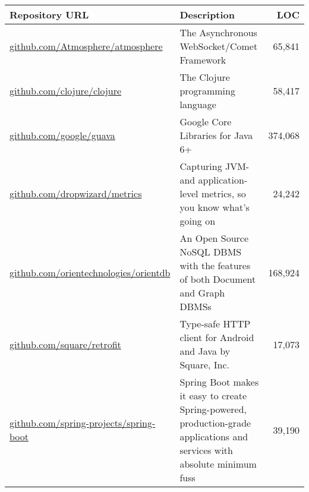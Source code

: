 \begin{tabular}{@{}lp{10cm}r@{}}
\toprule
Repository URL & Description & LOC \\
\midrule
\small\url{github.com/Atmosphere/atmosphere}   &   The Asynchronous WebSocket/Comet Framework &   65,841\\
\small\url{github.com/clojure/clojure}   &  The Clojure programming language &   58,417\\
\small\url{github.com/google/guava}  &  Google Core Libraries for Java 6+ &   374,068\\
\small\url{github.com/dropwizard/metrics} &   Capturing JVM- and application-level metrics, so you know what's going on &   24,242 \\
\small\url{github.com/orientechnologies/orientdb} &   An Open Source NoSQL DBMS with the features of both Document and Graph DBMSs  &   168,924\\
\small\url{github.com/square/retrofit}  &   Type-safe HTTP client for Android and Java by Square, Inc. &   17,073\\
\small\url{github.com/spring-projects/spring-boot} &   Spring Boot makes it easy to create Spring-powered, production-grade applications and services with absolute minimum fuss  &  39,190 \\
\bottomrule
\end{tabular}
